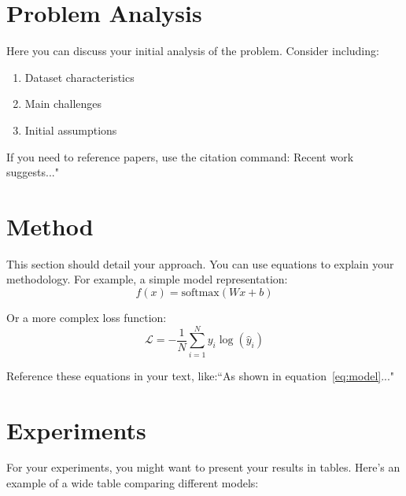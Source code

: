 \documentclass[11pt]{article}
\begin{document}
\begin{multicols}{2}
        
        \section{Problem Analysis}
        Here you can discuss your initial analysis of the problem. Consider including:
        \begin{enumerate}
            \item Dataset characteristics
            \item Main challenges
            \item Initial assumptions
        \end{enumerate}

        \noindent If you need to reference papers, use the citation command: Recent work~\cite{lecun2015deep} suggests..."

        \section{Method}
        This section should detail your approach. You can use equations to explain your methodology. For example, a simple model representation:
        \begin{equation}
            \label{eq:model}
            f(x) = \text{softmax}(Wx + b)
        \end{equation}

        \noindent Or a more complex loss function:
        \begin{equation}
            \label{eq:loss}
            \mathcal{L} = -\frac{1}{N}\sum_{i=1}^{N} y_i\log(\hat{y}_i)
        \end{equation}

        \noindent Reference these equations in your text, like:``As shown in equation~\ref{eq:model}..."

        \section{Experiments}
        For your experiments, you might want to present your results in tables. Here's an example of a wide table comparing different models:


\end{multicols}
\end{document}
